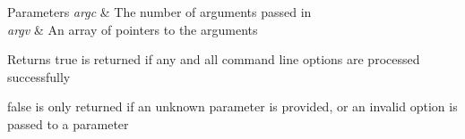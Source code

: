 \begin{DoxyParams}{Parameters}
{\em argc} & The number of arguments passed in \\
\hline
{\em argv} & An array of pointers to the arguments \\
\hline
\end{DoxyParams}
\begin{DoxyReturn}{Returns}
true is returned if any and all command line options are processed successfully 

false is only returned if an unknown parameter is provided, or an invalid option is passed to a parameter 
\end{DoxyReturn}
